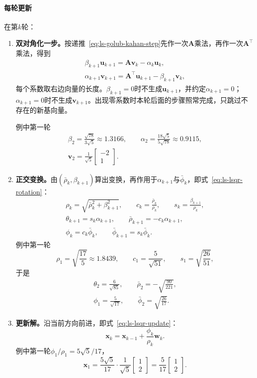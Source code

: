 \paragraph{每轮更新}
在第$k$轮：
\begin{enumerate}
 \item \textbf{双对角化一步。}按递推~\eqref{eq:ls-golub-kahan-step}先作一次$\bm A$乘法，再作一次$\bm A^\top$乘法，得到
 \[
  \begin{gathered}
  \beta_{k+1}\bm u_{k+1}=\bm A\bm v_k-\alpha_k\bm u_k,\\
  \alpha_{k+1}\bm v_{k+1}=\bm A^\top\bm u_{k+1}-\beta_{k+1}\bm v_k ,
  \end{gathered}
 \]
 每个系数取右边向量的长度。$\beta_{k+1}=0$时不生成$\bm u_{k+1}$，并约定$\alpha_{k+1}=0$；$\alpha_{k+1}=0$时不生成$\bm v_{k+1}$。出现零系数时本轮后面的步骤照常完成，只跳过不存在的新基向量。

 例中第一轮
 \[
  \begin{gathered}
  \beta_2=\frac{\sqrt{78}}{3\sqrt5}\approx1.3166,\qquad
  \alpha_2=\frac{18\sqrt5}{5\sqrt{78}}\approx0.9115,\\
  \bm v_2=\frac1{\sqrt5}\begin{bmatrix}-2\\1\end{bmatrix}.
  \end{gathered}
 \]

 \item \textbf{正交变换。}由$(\bar\rho_k,\beta_{k+1})$算出变换，再作用于$\alpha_{k+1}$与$\bar\phi_k$，即式~\eqref{eq:ls-lsqr-rotation}：
 \[
  \begin{gathered}
  \rho_k=\sqrt{\bar\rho_k^2+\beta_{k+1}^2},\qquad c_k=\frac{\bar\rho_k}{\rho_k},\qquad s_k=\frac{\beta_{k+1}}{\rho_k},\\
  \theta_{k+1}=s_k\alpha_{k+1},\qquad \bar\rho_{k+1}=-c_k\alpha_{k+1},\\
  \phi_k=c_k\bar\phi_k,\qquad \bar\phi_{k+1}=s_k\bar\phi_k .
  \end{gathered}
 \]
 例中第一轮
 \[
  \rho_1=\sqrt{\frac{17}5}\approx1.8439,\qquad c_1=\frac5{\sqrt{51}},\qquad s_1=\sqrt{\frac{26}{51}},
 \]
 于是
 \[
  \begin{gathered}
  \theta_2=\frac6{\sqrt{85}},\qquad \bar\rho_2=-\sqrt{\frac{90}{221}},\\
  \phi_1=\frac5{\sqrt{17}},\qquad \bar\phi_2=\sqrt{\frac{26}{17}} .
  \end{gathered}
 \]

 \item \textbf{更新解。}沿当前方向前进，即式~\eqref{eq:ls-lsqr-update}：
 \[
  \bm x_k=\bm x_{k-1}+\frac{\phi_k}{\rho_k}\bm w_k .
 \]
 例中第一轮$\phi_1/\rho_1=5\sqrt5/17$，
 \[
  \bm x_1=\frac{5\sqrt5}{17}\cdot\frac1{\sqrt5}\begin{bmatrix}1\\2\end{bmatrix}=\frac5{17}\begin{bmatrix}1\\2\end{bmatrix}.
 \]


\end{enumerate}
